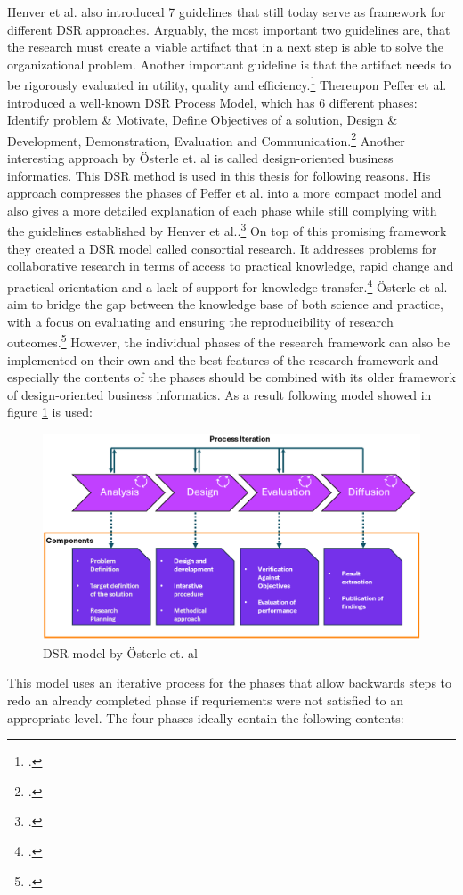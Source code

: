 Henver et al. also introduced 7 guidelines that still today serve as framework for different \ac{DSR} approaches.
Arguably, the most important two guidelines are, that the research must create a viable artifact that in a next step is able to solve the organizational problem. 
Another important guideline is that the artifact needs to be rigorously evaluated in utility, quality and efficiency.\footcite[83]{hevnerDesignScienceInformation2004a}
Thereupon Peffer et al. introduced a well-known \ac{DSR} Process Model, which has 6 different phases: Identify problem \& Motivate, Define Objectives of a solution, 
Design \& Development, Demonstration, Evaluation and Communication.\footcite[cf.][54]{peffersDesignScienceResearch2007a}
Another interesting approach by Österle et. al is called design-oriented business informatics. 
This \ac{DSR} method is used in this thesis for following reasons.
His approach compresses the phases of Peffer et al. into a more compact model and also gives a more detailed explanation of each phase while still complying with the guidelines established by Henver et al..\footcite[cf.][1-6]{oesterleMemorandumZurGestaltungsorientierten2010}
On top of this promising framework they created a \ac{DSR} model called consortial research.
It addresses problems for collaborative research in terms of access to practical knowledge, rapid change and practical orientation and a lack of support for knowledge transfer.\footcite[cf.][273-274]{oesterleKonsortialforschung2010}
Österle et al. aim to bridge the gap between the knowledge base of both science and practice, with a focus on evaluating and ensuring the reproducibility of research outcomes.\footcite[cf.][5]{oesterleMemorandumZurGestaltungsorientierten2010}
However, the individual phases of the research framework can also be implemented on their own and the best features 
of the research framework and especially the contents of the phases should be combined with its older framework of design-oriented business informatics.
As a result following model showed in figure \ref{DSR_Modell} is used:
\begin{figure}[H]
    \centering
    \includegraphics[width=0.9\linewidth]{graphics/DSR_Modell.png}
    \caption{\ac{DSR} model by Österle et. al\protect\footnotemark}
    \label{DSR_Modell}
\end{figure}
This model uses an iterative process for the phases that allow backwards steps to redo an already completed phase if requriements were not satisfied to an appropriate level.
The four phases ideally contain the following contents:

